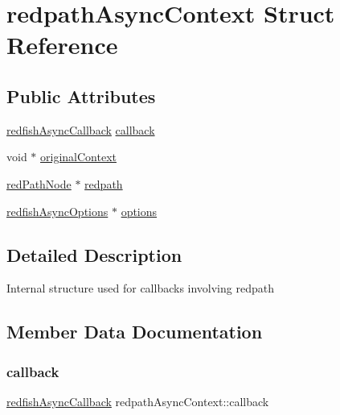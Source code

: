 \hypertarget{structredpathAsyncContext}{}\section{redpath\+Async\+Context Struct Reference}
\label{structredpathAsyncContext}
\subsection*{Public Attributes}
\begin{DoxyCompactItemize}
\item 
\hyperlink{redfishService_8h_a13c86956ea56ba1940a2b662e317264e}{redfish\+Async\+Callback} \hyperlink{structredpathAsyncContext_ac792549cfab7c6734c8b0338043d8788}{callback}
\item 
void $\ast$ \hyperlink{structredpathAsyncContext_abe2573fe9e61a4dbdba5e9da2df3ccde}{original\+Context}
\item 
\hyperlink{redpath_8h_a8b4f53a300a73308d7a81abaa2258fc6}{red\+Path\+Node} $\ast$ \hyperlink{structredpathAsyncContext_a6891b0c642edde43577b6f130d097d54}{redpath}
\item 
\hyperlink{structredfishAsyncOptions}{redfish\+Async\+Options} $\ast$ \hyperlink{structredpathAsyncContext_aa9cad0a8f6b371db4ec82c4c3d104edb}{options}
\end{DoxyCompactItemize}


\subsection{Detailed Description}
Internal structure used for callbacks involving redpath 

\subsection{Member Data Documentation}
\mbox{\label{structredpathAsyncContext_ac792549cfab7c6734c8b0338043d8788}} 
\subsubsection{\texorpdfstring{callback}{callback}}
{\footnotesize\ttfamily \hyperlink{redfishService_8h_a13c86956ea56ba1940a2b662e317264e}{redfish\+Async\+Callback} redpath\+Async\+Context\+::callback}

